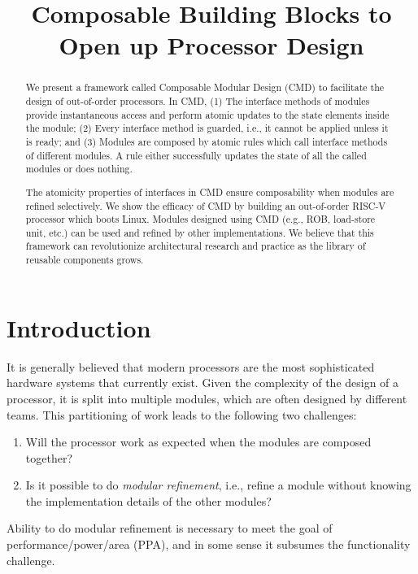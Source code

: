 \documentclass[conference]{IEEEtran}
\begin{document}
\title{Composable Building Blocks to Open up Processor Design}

\author{
}

\maketitle

\thispagestyle{plain}
\pagestyle{plain}

\begin{abstract}
    We present a framework called Composable Modular Design (CMD) to facilitate the design of out-of-order processors. In CMD, (1) The interface methods of modules provide instantaneous access and perform atomic updates to the state elements inside the module; (2) Every interface method is guarded, i.e., it cannot be applied unless it is ready; and (3) Modules are composed by atomic rules which call interface methods of different modules. A rule either successfully updates the state of all the called modules or does nothing.
    
    The atomicity properties of interfaces in CMD ensure composability when modules are refined selectively. We show the efficacy of CMD by building an out-of-order RISC-V processor which boots Linux. Modules designed using CMD (e.g., ROB, load-store unit, etc.) can be used and refined by other implementations. We believe that this framework can revolutionize architectural research and practice as the library of reusable components grows.
\end{abstract}

\section{Introduction}\label{sec:intro}
It is generally believed that modern processors are the most sophisticated hardware systems that currently exist.
Given the complexity of the design of a processor, it is split into multiple modules, which are often designed by different teams.
This partitioning of work leads to the following two challenges:
\begin{enumerate}
    \item Will the processor work as expected when the modules are composed together?
    \item Is it possible to do \emph{modular refinement}, i.e., refine a module without knowing the implementation details of the other modules?
\end{enumerate}
Ability to do modular refinement is necessary to meet the goal of performance/power/area (PPA), and in some sense it subsumes the functionality challenge. 
\end{document}
